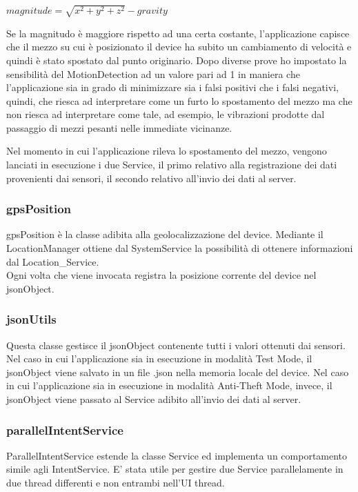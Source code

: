\documentclass[12pt,a4paper,openright,twoside]{report}
\begin{document}
\begin{center}
$ magnitude = \sqrt{ x^2 + y^2 + z^2} - gravity$
\end{center}

Se la magnitudo è maggiore rispetto ad una certa costante, l'applicazione capisce che il mezzo su cui è posizionato il device ha subito un cambiamento di velocità e quindi è stato spostato dal punto originario. Dopo diverse prove ho impostato la sensibilità del MotionDetection ad un valore pari ad 1 in maniera che l'applicazione sia in grado di minimizzare sia i falsi positivi che i falsi negativi, quindi, che riesca ad interpretare come un furto lo spostamento del mezzo ma che non riesca ad interpretare come tale, ad esempio, le vibrazioni prodotte dal passaggio di mezzi pesanti nelle immediate vicinanze.

Nel momento in cui l'applicazione rileva lo spostamento del mezzo, vengono lanciati in esecuzione i due Service, il primo relativo alla registrazione dei dati provenienti dai sensori, il secondo relativo all'invio dei dati al server.	

\subsubsection*{gpsPosition}
gpsPosition è la classe adibita alla geolocalizzazione del device. Mediante il LocationManager ottiene dal SystemService la possibilità di ottenere informazioni dal Location\_Service. \\
Ogni volta che viene invocata registra la posizione corrente del device nel jsonObject.

\subsubsection*{jsonUtils}
Questa classe gestisce il jsonObject contenente tutti i valori ottenuti dai sensori. Nel caso in cui l'applicazione sia in esecuzione in modalità Test Mode, il jsonObject viene salvato in un file .json nella memoria locale del device. Nel caso in cui l'applicazione sia in esecuzione in modalità Anti-Theft Mode, invece, il jsonObject viene passato al Service adibito all'invio dei dati al server.

\subsubsection*{parallelIntentService}
ParallelIntentService \cite{K18} estende la classe Service ed implementa un comportamento simile agli IntentService.
E' stata utile per gestire due Service parallelamente in due thread differenti e non entrambi nell'UI thread.
\end{document}
